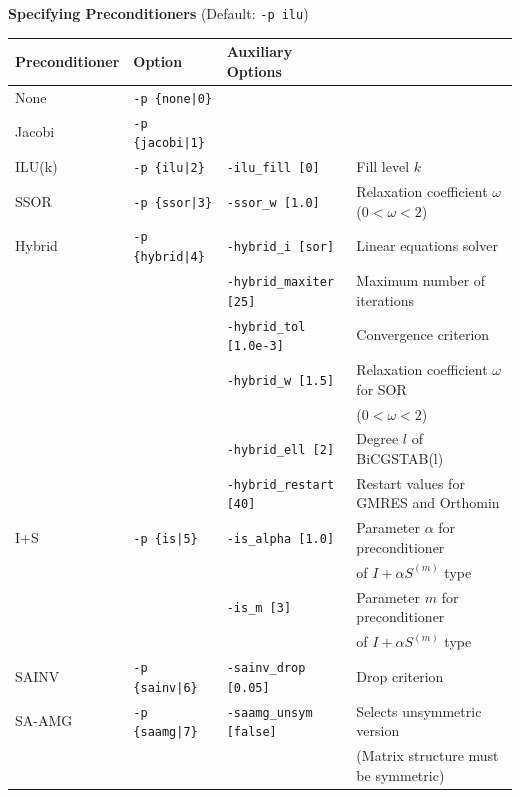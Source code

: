 \documentclass[a4paper]{article}
\begin{document}
\begin{minipage}[t]{\textwidth}
\begin{center}
{\bf Specifying Preconditioners} (Default: \verb=-p ilu=)\\
\begin{tabular}{l|lll}\hline\hline
Preconditioner   & Option           & Auxiliary Options \\ \hline
None     & \verb=-p {none|0}=    &   \\
Jacobi   & \verb=-p {jacobi|1}=  &     \\
ILU(k)   & \verb=-p {ilu|2}=     & \verb=-ilu_fill [0]=    & Fill level $k$ \\
SSOR     & \verb=-p {ssor|3}=    & \verb=-ssor_w [1.0]=    & Relaxation coefficient $\omega$ ($0<\omega<2$) \\
Hybrid   & \verb=-p {hybrid|4}=  & \verb=-hybrid_i [sor]=  & Linear
 equations solver \\
         &                       & \verb=-hybrid_maxiter [25]= & Maximum number of iterations \\
         &                       & \verb=-hybrid_tol [1.0e-3]= & Convergence criterion \\
         &                       & \verb=-hybrid_w [1.5]=      & Relaxation coefficient $\omega$ for SOR\\
         &                       &                             &  ($0<\omega<2$) \\
         &                       & \verb=-hybrid_ell [2]=      & Degree $l$ of BiCGSTAB(l) \\
         &                       & \verb=-hybrid_restart [40]= & Restart values for GMRES and Orthomin \\
I+S      & \verb=-p {is|5}=      & \verb=-is_alpha [1.0]=  &  Parameter $\alpha$ for preconditioner \\
         &                       &                         &   of $I+\alpha S^{(m)}$ type \\
         &                       & \verb=-is_m [3]=        & Parameter $m$ for preconditioner \\
         &                       &                         &  of $I+\alpha S^{(m)}$ type \\
SAINV    & \verb=-p {sainv|6}=   & \verb=-sainv_drop [0.05]=    & Drop criterion\\
SA-AMG   & \verb=-p {saamg|7}=   & \verb=-saamg_unsym [false]=    &
 Selects unsymmetric version    \\
         &                       &                             & (Matrix structure must be symmetric)    \\

\end{tabular}
\end{center}
\end{minipage}
\end{document}
